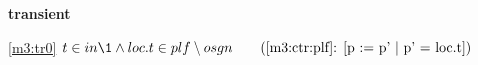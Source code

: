 \textbf{transient}
\begin{block}
\item[ \eqref{m3:tr0} ]$t \in in  %
			\1\land loc.t \in plf \setminus osgn  \qquad \text{(\ref{m3:ctr:plf}: [p := p' | p' = loc.t])}$ %
\end{block}
